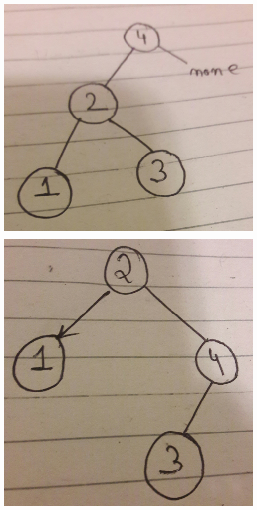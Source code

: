 \documentclass{article}
\begin{document}
\includegraphics[scale=0.05]{9.jpg}




\includegraphics[scale=0.05]{10.jpg}
\end{document}
